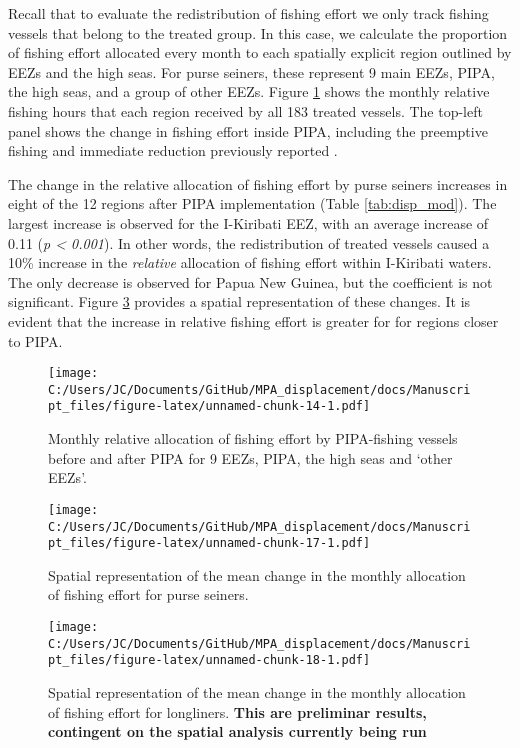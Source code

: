 \documentclass[12pt,]{article}
\begin{document}
Recall that to evaluate the redistribution of fishing effort we only
track fishing vessels that belong to the treated group. In this case, we
calculate the proportion of fishing effort allocated every month to each
spatially explicit region outlined by EEZs and the high seas. For purse
seiners, these represent 9 main EEZs, PIPA, the high seas, and a group
of other EEZs. Figure \ref{fig:redist_trend_ps} shows the monthly
relative fishing hours that each region received by all 183 treated
vessels. The top-left panel shows the change in fishing effort inside
PIPA, including the preemptive fishing and immediate reduction
previously reported \citep{mcdermott_2018}.

The change in the relative allocation of fishing effort by purse seiners
increases in eight of the 12 regions after PIPA implementation (Table
\ref{tab:disp_mod}). The largest increase is observed for the I-Kiribati
EEZ, with an average increase of 0.11 (\emph{p \textless{} 0.001}). In
other words, the redistribution of treated vessels caused a 10\%
increase in the \emph{relative} allocation of fishing effort within
I-Kiribati waters. The only decrease is observed for Papua New Guinea,
but the coefficient is not significant. Figure \ref{fig:map_change_ps}
provides a spatial representation of these changes. It is evident that
the increase in relative fishing effort is greater for for regions
closer to PIPA.

\begin{figure}
\centering
\texttt{[image: C:/Users/JC/Documents/GitHub/MPA\_displacement/docs/Manuscript\_files/figure-latex/unnamed-chunk-14-1.pdf]}
\caption{\label{fig:unnamed-chunk-14}\label{fig:redist_trend_ps}Monthly
relative allocation of fishing effort by PIPA-fishing vessels before and
after PIPA for 9 EEZs, PIPA, the high seas and `other EEZs'.}
\end{figure}

\begin{figure}
\centering
\texttt{[image: C:/Users/JC/Documents/GitHub/MPA\_displacement/docs/Manuscript\_files/figure-latex/unnamed-chunk-17-1.pdf]}
\caption{\label{fig:unnamed-chunk-17}\label{fig:map_change_ps}Spatial
representation of the mean change in the monthly allocation of fishing
effort for purse seiners.}
\end{figure}

\begin{figure}
\centering
\texttt{[image: C:/Users/JC/Documents/GitHub/MPA\_displacement/docs/Manuscript\_files/figure-latex/unnamed-chunk-18-1.pdf]}
\caption{\label{fig:unnamed-chunk-18}\label{fig:map_change_ps}Spatial
representation of the mean change in the monthly allocation of fishing
effort for longliners. \textbf{This are preliminar results, contingent
on the spatial analysis currently being run}}
\end{figure}
\end{document}
